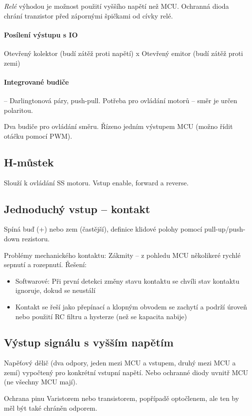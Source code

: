 \documentclass[a4paper, 11pt]{report}
\begin{document}
\emph{Relé} výhodou je možnost použití vyššího napětí než MCU. Ochranná dioda chrání tranzistor před zápornými špičkami od cívky relé.

\paragraph{Posílení výstupu s IO} Otevřený kolektor (budí zátěž proti napětí) x Otevřený emitor (budí zátěž proti zemi)

\paragraph{Integrované budiče} -- Darlingtonová páry, push-pull. Potřeba pro ovládání motorů -- směr je určen polaritou.

Dva budiče pro ovládání směru. Řízeno jedním výstupem MCU (možno řídit otáčku pomocí PWM).

\subsection{H-můstek}
Slouží k ovládání SS motoru. Vstup enable, forward a reverse.

\subsection{Jednoduchý vstup -- kontakt}
Spíná buď (+) nebo zem (častější), definice klidové polohy pomocí pull-up/push-down rezistoru.

Problémy mechanického kontaktu: Zákmity -- z pohledu MCU několikeré rychlé sepnutí a rozepnutí. Řešení:
\begin{itemize}
	\item Softwarové: Při první detekci změny stavu kontaktu se chvíli stav kontaktu ignoruje, dokud se neustálí
	\item Kontakt se řeší jako přepínací a klopným obvodem se zachytí a podrží úroveň nebo použití RC filtru a hysterze (než se kapacita nabije)
\end{itemize}

\subsection{Výstup signálu s vyšším napětím}
Napěťový dělič (dva odpory, jeden mezi MCU a vstupem, druhý mezi MCU a zemí) vypočtený pro konkrétní vstupní napětí. Nebo ochranné diody uvnitř MCU (ne všechny MCU mají).

Ochrana pinu Varistorem nebo transistorem, popřípadě optočlenem, ale ten by měl být také chráněn odporem.
\end{document}
